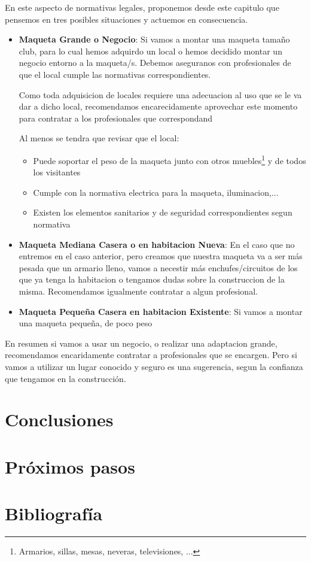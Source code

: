 En este aspecto de normativas legales, proponemos desde este capitulo que pensemos en tres posibles situaciones y actuemos en consecuencia.
\begin{itemize}
	\item \textbf{Maqueta Grande o Negocio}: Si vamos a montar una maqueta tamaño club, para lo cual hemos adquirdo un local o hemos decidido montar un negocio entorno a la maqueta/s. Debemos aseguranos con profesionales de que el local cumple las normativas correspondientes.

Como toda adquisicion de locales requiere una adecuacion al uso que se le va dar a dicho local, recomendamos encarecidamente aprovechar este momento para contratar a los profesionales que correspondand

Al menos se tendra que revisar que el local:
	\begin{itemize}
		\item Puede soportar el peso de la maqueta junto con otros muebles\footnote{Armarios, sillas, mesas, neveras, televisiones, ...} y de todos los visitantes
		\item Cumple con la normativa electrica para la maqueta, iluminacion,...
		\item Existen los elementos sanitarios y de seguridad correspondientes segun normativa
	\end{itemize}

	\item \textbf{Maqueta Mediana Casera o en habitacion Nueva}: En el caso que no entremos en el caso anterior, pero creamos que nuestra maqueta va a ser más pesada que un armario lleno, vamos a necestir más enchufes/circuitos de los que ya tenga la habitacion o tengamos dudas sobre la construccion de la misma. Recomendamos igualmente contratar a algun profesional. 
	\item \textbf{Maqueta Pequeña Casera en habitacion Existente}: Si vamos a montar una maqueta pequeña, de poco peso
\end{itemize}
En resumen si vamos a usar un negocio, o realizar una adaptacion grande, recomendamos encaridamente contratar a profesionales que se encargen. Pero si vamos a utilizar un lugar conocido y seguro es una sugerencia, segun la confianza que tengamos en la construcción.
\section{Conclusiones}
\section{Próximos pasos}

\section{Bibliografía}
\printbibliography[heading=subbibliography]
